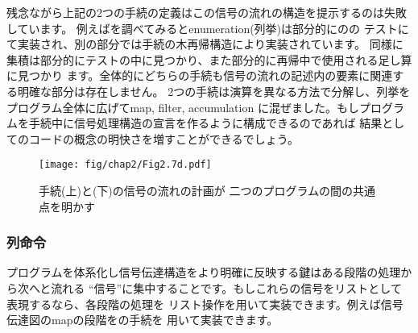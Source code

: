 残念ながら上記の2つの手続の定義はこの信号の流れの構造を提示するのは失敗しています。
例えばを調べてみるとenumeration(列挙)は部分的にのの
テストにて実装され、別の部分では手続の木再帰構造により実装されています。
同様に集積は部分的にテストの中に見つかり、また部分的に再帰中で使用される足し算に見つかり
ます。全体的にどちらの手続も信号の流れの記述内の要素に関連する明確な部分は存在しません。
2つの手続は演算を異なる方法で分解し、列挙をプログラム全体に広げてmap, filter, accumulation
に混ぜました。もしプログラムを手続中に信号処理構造の宣言を作るように構成できるのであれば
結果としてのコードの概念の明快さを増すことができるでしょう。

\begin{figure}[tb]
\label{Figure 2.7}
\centering
\begin{comment}
\begin{quote}
\heading{Figure 2.7:} The signal-flow plans for the
procedures \code{sum\-/odd\-/squares} (top) and \code{even\-/fibs} (bottom) reveal
the commonality between the two programs.

\begin{example}
+-------------+   +-------------+   +-------------+   +-------------+
| enumerate:  |-->| filter:     |-->| map:        |-->| accumulate: |
| tree leaves |   | odd?        |   | square      |   | +, 0        |
+-------------+   +-------------+   +-------------+   +-------------+

+-------------+   +-------------+   +-------------+   +-------------+
| enumerate:  |-->| map:        |-->| filter:     |-->| accumulate: |
| integers    |   | fib         |   | even?       |   | cons, ()    |
+-------------+   +-------------+   +-------------+   +-------------+
\end{example}
\end{quote}
\end{comment}
\texttt{[image: fig/chap2/Fig2.7d.pdf]} 
\par\bigskip
\noindent
{} 手続(上)と(下)の信号の流れの計画が
二つのプログラムの間の共通点を明かす
\end{figure}

\subsubsection*{列命令}



プログラムを体系化し信号伝達構造をより明確に反映する鍵はある段階の処理から次へと流れる
``信号''に集中することです。もしこれらの信号をリストとして表現するなら、各段階の処理を
リスト操作を用いて実装できます。例えば信号伝達図のmapの段階をの手続を
用いて実装できます。

